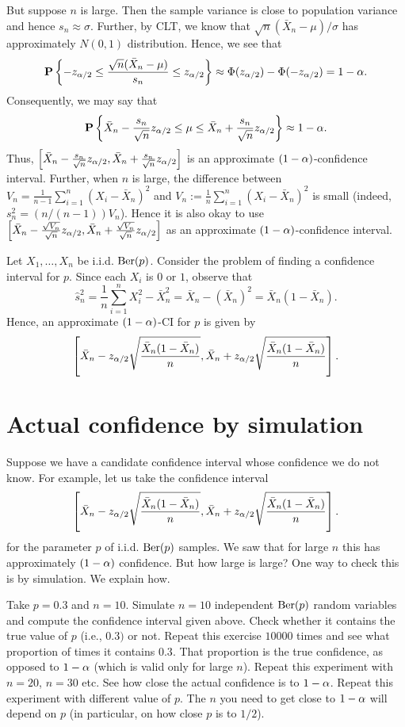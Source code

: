 \documentclass[preprint,  11pt]{amsart}
\def\sig{{\sigma}}
\begin{document}
 But suppose $n$ is large. Then the sample variance is close to population variance and hence $s_{n}\approx \sig
$. Further, by CLT, we know that $\sqrt{n}(\bar{X}_{n}-\mu)/\sig$ has approximately    $N(0,1)$ distribution. Hence, we see that
$$
\mathbf{P}\left\{-z_{\alpha/2}\le  \frac{\sqrt{n}(\bar{X}_{n}-\mu)}{s_{n}} \le z_{\alpha/2}\right\} \approx \Phi(z_{\alpha/2})-\Phi(-z_{\alpha/2}) =1-\alpha.
$$
Consequently, we may say that
$$
\mathbf{P}\left\{ \bar{X}_{n}-\frac{s_{n}}{\sqrt{n}}z_{\alpha/2} \le \mu \le \bar{X}_{n}+\frac{s_{n}}{\sqrt{n}}z_{\alpha/2}\right\} \approx 1-\alpha.
$$
Thus, $\left[\bar{X}_{n}-\frac{s_{n}}{\sqrt{n}}z_{\alpha/2}, \bar{X}_{n}+\frac{s_{n}}{\sqrt{n}}z_{\alpha/2} \right]$ is an approximate $(1-\alpha)$-confidence interval. Further, when $n$ is large, the difference between $V_{n}=\frac{1}{n-1}\sum_{i=1}^{n}(X_{i}-\bar{X}_{n})^{2}$ and $V_{n}:=\frac{1}{n}\sum_{i=1}^{n}(X_{i}-\bar{X}_{n})^{2}$ is small (indeed, $s_{n}^{2}=(n/(n-1))V_{n}$). Hence it is also okay to use $\left[\bar{X}_{n}-\frac{\sqrt{V_{n}}}{\sqrt{n}}z_{\alpha/2}, \bar{X}_{n}+\frac{\sqrt{V_{n}}}{\sqrt{n}}z_{\alpha/2} \right]$ as an approximate $(1-\alpha)$-confidence interval.

\beg Let $X_{1},\ldots ,X_{n}$ be i.i.d. $\mbox{Ber}(p)$. Consider the problem of finding a confidence interval for $p$. Since each $X_{i}$ is $0$ or $1$, observe that
$$
\hat{s}_{n}^{2}= \frac{1}{n}\sum_{i=1}^{n}X_{i}^{2} - \bar{X}_{n}^{2} = \bar{X}_{n}-(\bar{X}_{n})^{2} = \bar{X}_{n}(1-\bar{X}_{n}).
$$
\eeg
Hence, an approximate $(1-\alpha)$-CI for $p$ is given by
$$
\left[\bar{X}_{n}-z_{\alpha/2}\sqrt{\frac{\bar{X}_{n}(1-\bar{X}_{n})}{n}}, \bar{X}_{n}+z_{\alpha/2}\sqrt{\frac{\bar{X}_{n}(1-\bar{X}_{n})}{n}}\right].
$$

\section{Actual confidence by simulation}
Suppose we have a candidate confidence interval whose confidence we do not know. For example, let us take the confidence interval $$
\left[\bar{X}_{n}-z_{\alpha/2}\sqrt{\frac{\bar{X}_{n}(1-\bar{X}_{n})}{n}}, \bar{X}_{n}+z_{\alpha/2}\sqrt{\frac{\bar{X}_{n}(1-\bar{X}_{n})}{n}}\right].
$$ for the parameter $p$ of i.i.d. $\mbox{Ber}(p)$ samples. We saw that for large $n$ this has approximately $(1-\alpha)$ confidence. But how large is large? One way to check this is by simulation. We explain how.

Take $p=0.3$ and $n=10$. Simulate $n=10$ independent $\mbox{Ber}(p)$ random variables and compute the confidence interval given above. Check whether it contains the true value of $p$ (i.e., $0.3)$ or not. Repeat this exercise $10000$ times and see what proportion of times it contains $0.3$. That proportion is the true confidence, as opposed to $1-\alpha$ (which is valid only for large $n$). Repeat this experiment with $n=20$, $n=30$ etc. See how close the actual confidence is to $1-\alpha$. Repeat this experiment with different value of $p$. The $n$ you need to get close to $1-\alpha$ will depend on $p$ (in particular, on how close $p$ is to $1/2$).
\end{document}
